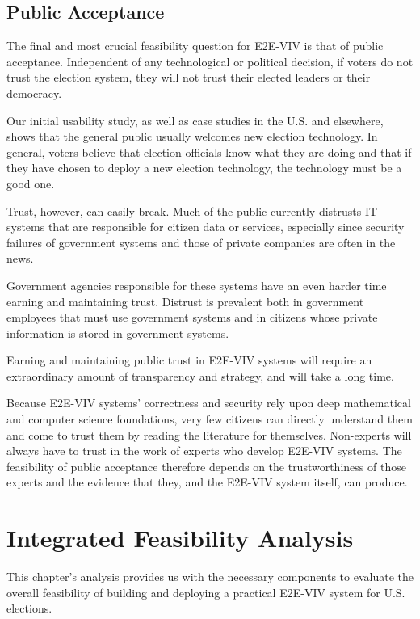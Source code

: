 \subsection{Public Acceptance}

The final and most crucial feasibility question for E2E-VIV is that of
public acceptance.  Independent of any technological or political
decision, if voters do not trust the election system, they will not
trust their elected leaders or their democracy.

Our initial usability study, as well as case studies in the U.S. and
elsewhere, shows that the general public usually welcomes new election
technology.  In general, voters believe that election officials know
what they are doing and that if they have chosen to deploy a new
election technology, the technology must be a good one.

Trust, however, can easily break. Much of the public currently
distrusts IT systems that are responsible for citizen data or
services, especially since security failures of government systems and
those of private companies are often in the news.

Government agencies responsible for these systems have an even harder
time earning and maintaining trust.  Distrust is prevalent both in
government employees that must use government systems and in citizens
whose private information is stored in government systems.

Earning and maintaining public trust in E2E-VIV systems will require
an extraordinary amount of transparency and strategy, and will take a
long time.

Because E2E-VIV systems' correctness and security rely upon deep
mathematical and computer science foundations, very few citizens can
directly understand them and come to trust them by reading the
literature for themselves. Non-experts will always have to trust in
the work of experts who develop E2E-VIV systems. The feasibility of public
acceptance therefore depends on the trustworthiness of those experts
and the evidence that they, and the E2E-VIV system itself, can
produce.

\section{Integrated Feasibility Analysis}

This chapter's analysis provides us with the necessary components to
evaluate the overall feasibility of building and deploying a practical
E2E-VIV system for U.S. elections.

